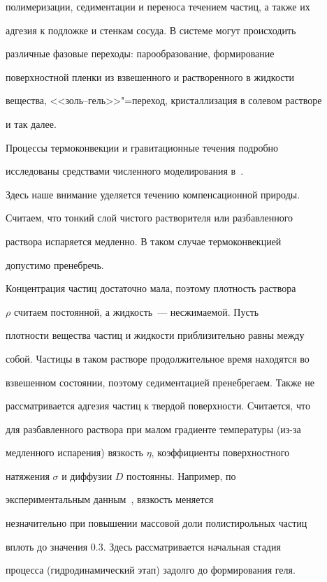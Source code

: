 полимеризации, седиментации и переноса течением частиц, а также их

адгезия к подложке и стенкам сосуда. В системе могут происходить

различные фазовые переходы: парообразование, формирование

поверхностной пленки из взвешенного и растворенного в жидкости

вещества, <<золь--гель>>"=переход, кристаллизация в солевом растворе

и так далее.



Процессы термоконвекции и гравитационные течения подробно

исследованы средствами численного моделирования в~\cite{Kaneda2010}.

Здесь наше внимание уделяется течению компенсационной природы.

Считаем, что тонкий слой чистого растворителя или разбавленного

раствора испаряется медленно. В таком случае термоконвекцией

допустимо пренебречь.



Концентрация частиц достаточно мала, поэтому плотность раствора

$\rho$ считаем постоянной, а жидкость~--- несжимаемой. Пусть

плотности вещества частиц и жидкости приблизительно равны между

собой. Частицы в таком растворе продолжительное время находятся во

взвешенном состоянии, поэтому седиментацией пренебрегаем. Также не

рассматривается адгезия частиц к твердой поверхности. Считается, что

для разбавленного раствора при малом градиенте температуры (из-за

медленного испарения) вязкость $\eta$, коэффициенты поверхностного

натяжения $\sigma$ и диффузии $D$ постоянны. Например, по

экспериментальным данным~\cite{Youngki2009}, вязкость меняется

незначительно при повышении массовой доли полистирольных частиц

вплоть до значения 0.3. Здесь рассматривается начальная стадия

процесса (гидродинамический этап) задолго до формирования геля.



